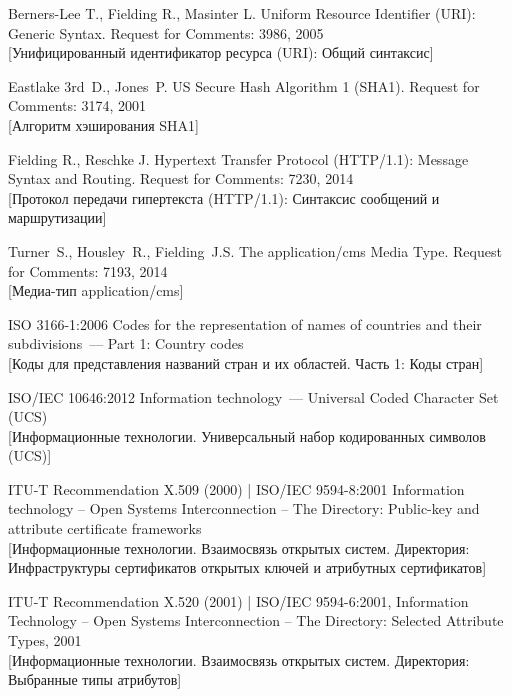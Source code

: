 \clearpage
\renewcommand{\bibname}{Библиография}
\begin{thebibliography}{9}

Berners-Lee T., Fielding R., Masinter L. 
Uniform Resource Identifier (URI): Generic Syntax.  
Request for Comments: 3986, 2005\\
{\small [Унифицированный идентификатор ресурса (URI): Общий синтаксис]}

Eastlake 3rd~D., Jones~P.
US Secure Hash Algorithm 1 (SHA1). 
Request for Comments: 3174, 2001\\   
{\small [Алгоритм хэширования SHA1]}

Fielding R., Reschke J.
Hypertext Transfer Protocol (HTTP/1.1): Message Syntax and Routing. 
Request for Comments: 7230, 2014\\ 
{\small [Протокол передачи гипертекста (HTTP/1.1): Синтаксис сообщений и 
маршрутизации]}

Turner~S., Housley~R., Fielding~J.S.  
The application/cms Media Type. 
Request for Comments: 7193, 2014\\ 
{\small [Медиа-тип application/cms]}

ISO 3166-1:2006 Codes for the representation of names of countries and 
their subdivisions~--- Part 1: Country codes\\
{\small [Коды для представления названий стран и их областей. Часть 1: 
Коды стран]} 

ISO/IEC 10646:2012 Information technology~--- Universal Coded Character 
Set (UCS)\\
{\small [Информационные технологии. Универсальный набор кодированных 
символов (UCS)]}

ITU-T Recommendation X.509 (2000) | ISO/IEC 9594-8:2001
Information technology -- Open Systems Interconnection -- 
The Directory: Public-key and attribute certificate frameworks\\
{\small [Информационные технологии. Взаимосвязь открытых систем.
Директория: Инфраструктуры сертификатов открытых ключей и атрибутных 
сертификатов]} 

ITU-T Recommendation X.520 (2001) | ISO/IEC 9594-6:2001,
Information Technology -- Open Systems Interconnection --
The Directory: Selected Attribute Types, 2001\\
{\small [Информационные технологии. Взаимосвязь открытых систем.
Директория: Выбранные типы атрибутов]}


\end{thebibliography}
